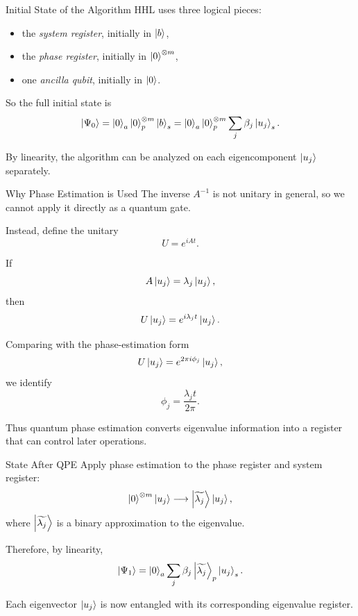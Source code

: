 \documentclass{beamer}
\begin{document}
\begin{frame}{Initial State of the Algorithm}
HHL uses three logical pieces:
\begin{itemize}
    \item the \emph{system register}, initially in \(\ket{b}\),
    \item the \emph{phase register}, initially in \(\ket{0}^{\otimes m}\),
    \item one \emph{ancilla qubit}, initially in \(\ket{0}\).
\end{itemize}

So the full initial state is
\[
\ket{\Psi_0}
=
\ket{0}_{a}\ket{0}^{\otimes m}_{p}\ket{b}_{s}
=
\ket{0}_{a}\ket{0}^{\otimes m}_{p}\sum_j \beta_j \ket{u_j}_{s}.
\]

By linearity, the algorithm can be analyzed on each eigencomponent \(\ket{u_j}\) separately.
\end{frame}

\begin{frame}{Why Phase Estimation is Used}
The inverse \(A^{-1}\) is not unitary in general, so we cannot apply it directly as a quantum gate.

Instead, define the unitary
\[
U=e^{iAt}.
\]

If
\[
A\ket{u_j}=\lambda_j \ket{u_j},
\]
then
\[
U\ket{u_j}=e^{i\lambda_j t}\ket{u_j}.
\]

Comparing with the phase-estimation form
\[
U\ket{u_j}=e^{2\pi i \phi_j}\ket{u_j},
\]
we identify
\[
\phi_j = \frac{\lambda_j t}{2\pi}.
\]

Thus quantum phase estimation converts eigenvalue information into a register that can control later operations.
\end{frame}

\begin{frame}{State After QPE}
Apply phase estimation to the phase register and system register:
\[
\ket{0}^{\otimes m}\ket{u_j}
\longrightarrow
\ket{\widetilde{\lambda_j}}\ket{u_j},
\]
where \(\ket{\widetilde{\lambda_j}}\) is a binary approximation to the eigenvalue.

Therefore, by linearity,
\[
\ket{\Psi_1}
=
\ket{0}_{a}
\sum_j \beta_j \ket{\widetilde{\lambda_j}}_{p}\ket{u_j}_{s}.
\]

Each eigenvector \(\ket{u_j}\) is now entangled with its corresponding eigenvalue register.
\end{frame}
\end{document}
